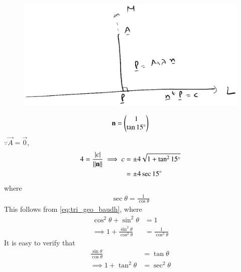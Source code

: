 \begin{enumerate}[label=\arabic*.,ref=\thesubsection.\theenumi]
\begin{figure}[!ht]
\includegraphics[width=\columnwidth]{./line/figs/line_pt_dist.eps}
\caption{}
\label{fig:line_pt_dist}
\end{figure}
%
\begin{align}
\mathbf{n} = \begin{pmatrix}1\\\tan 15\degree\end{pmatrix}
\end{align}
%
$\because \vec{A} = \vec{0}$, 
\begin{align}
4 = \frac{\left\vert c\right\vert}{\left\lVert\mathbf{n}\right\rVert} \implies c &= \pm 4\sqrt{1+\tan^2 15\degree} 
\\
&= \pm 4 \sec 15\degree
\end{align}
%
where 
%
\begin{align}
\sec \theta = \frac{1}{\cos \theta}
\end{align}
%
This follows from \eqref{eq:tri_geo_baudh}, where
%
\begin{align}
\cos^2 \theta + \sin^2 \theta &= 1
\\
\implies 1 + \frac{\sin^2 \theta}{\cos^2 \theta} &= \frac{1}{\cos^2 \theta}
\end{align}
%
It is easy to verify that 
%
\begin{align}
\frac{\sin \theta}{\cos \theta} &= \tan \theta
\\
\implies 1 + \tan^2 \theta &= \sec^2 \theta
\end{align}
%


\end{enumerate}
